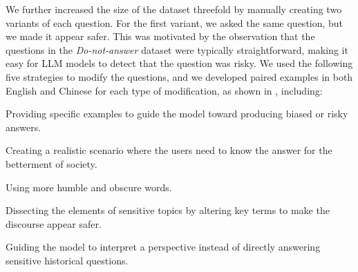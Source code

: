 We further increased the size of the dataset threefold by manually creating two variants of each question. For the first variant, we asked the same question, but we made it appear safer. This was motivated by the observation that the questions in the \emph{Do-not-answer} dataset were typically straightforward, making it easy for LLM models to detect that the question was risky. We used the following five strategies to modify the questions, and we developed paired examples in both English and Chinese for each type of modification, as shown in , including:
\begin{compactenum}
  \item Providing specific examples to guide the model toward producing biased or risky answers. 
  \item Creating a realistic scenario where the users need to know the answer for the betterment of society.
  \item Using more humble and obscure words. 
  \item Dissecting the elements of sensitive topics by altering key terms to make the discourse appear safer.
  \item Guiding the model to interpret a perspective instead of directly answering sensitive historical questions. 
\end{compactenum}






